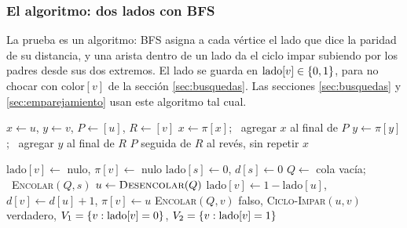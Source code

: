 \documentclass[11pt,letterpaper]{article}
\begin{document}
\subsubsection*{El algoritmo: dos lados con BFS}

La prueba es un algoritmo: BFS asigna a cada vértice el lado que dice
la paridad de su distancia, y una arista dentro de un lado da el ciclo
impar subiendo por los padres desde sus dos extremos. El lado se
guarda en $\text{lado}[v] \in \left\{ 0, 1 \right\}$, para no chocar con
$\text{color}[v]$ de la sección \ref{sec:busquedas}. Las secciones
\ref{sec:busquedas} y \ref{sec:emparejamiento} usan este algoritmo
tal cual.

\begin{algorithm}[H]
\caption{\textsc{Ciclo-Impar}$(u, v)$: el testigo de que no es
         bipartito}
\label{alg:bipartito-ciclo-impar}
\begin{algorithmic}[1]
 
  \State $x \gets u$, \quad $y \gets v$, \quad $P \gets [u]$, \quad
         $R \gets [v]$
   
    \State $x \gets \pi[x]$; \ agregar $x$ al final de $P$
    \State $y \gets \pi[y]$; \ agregar $y$ al final de $R$
  \EndWhile
  \State \Return $P$ seguida de $R$ al revés, sin repetir $x$
\EndProcedure
\end{algorithmic}
\end{algorithm}

\begin{algorithm}[H]
\caption{\textsc{Bipartito}$(G)$: dos lados con BFS}
\label{alg:bipartito-bfs}
\begin{algorithmic}[1]
    \State $\text{lado}[v] \gets$ nulo, \quad $\pi[v] \gets$ nulo
  \EndFor
   
      \State $\text{lado}[s] \gets 0$, \quad $d[s] \gets 0$
      \State $Q \gets$ cola vacía; \ \textsc{Encolar}$(Q, s)$
        \State $u \gets \textsc{Desencolar}(Q)$
            \State $\text{lado}[v] \gets 1 - \text{lado}[u]$, \quad
                   $d[v] \gets d[u] + 1$, \quad $\pi[v] \gets u$
            \State \textsc{Encolar}$(Q, v)$
            \State \Return falso, \textsc{Ciclo-Impar}$(u, v)$
          \EndIf
        \EndFor
      \EndWhile
    \EndIf
  \EndFor
  \State \Return verdadero,
         $V_1 = \left\{ v : \text{lado}[v] = 0 \right\}$,
         $V_2 = \left\{ v : \text{lado}[v] = 1 \right\}$
\EndProcedure
\end{algorithmic}
\end{algorithm}
\end{document}
